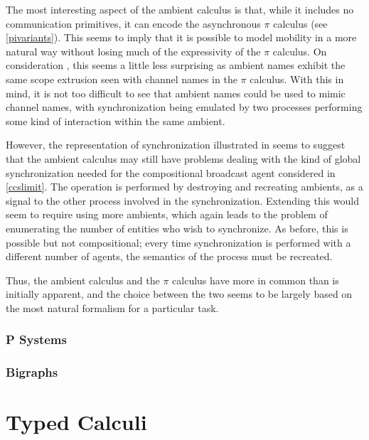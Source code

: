 The most interesting aspect of the ambient calculus is that, while it
includes no communication primitives, it can encode the asynchronous
$\pi$ calculus (see \ref{pivariants}).  This seems to imply that it is
possible to model mobility in a more natural way without losing much of
the expressivity of the $\pi$ calculus.  On consideration , this seems a
little less surprising as ambient names exhibit the same scope extrusion
seen with channel names in the $\pi$ calculus.  With this in mind, it is
not too difficult to see that ambient names could be used to mimic
channel names, with synchronization being emulated by two processes
performing some kind of interaction within the same ambient.

However, the representation of synchronization illustrated in \cite{amb}
seems to suggest that the ambient calculus may still have problems
dealing with the kind of global synchronization needed for the
compositional broadcast agent considered in \ref{ccslimit}.  The
operation is performed by destroying and recreating ambients, as a
signal to the other process involved in the synchronization.  Extending
this would seem to require using more ambients, which again leads to the
problem of enumerating the number of entities who wish to synchronize.
As before, this is possible but not compositional; every time
synchronization is performed with a different number of agents, the
semantics of the process must be recreated.

Thus, the ambient calculus and the $\pi$ calculus have more in common
than is initially apparent, and the choice between the two seems to be
largely based on the most natural formalism for a particular task.



\subsubsection{P Systems}
\label{psystems}

\subsubsection{Bigraphs}
\label{bigraphs}

\section{Typed Calculi}
\label{typedcalculi}

